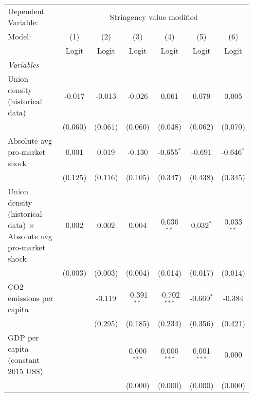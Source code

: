 
\begingroup
\centering
\begin{tabular}{lcccccc}
   \toprule
   Dependent Variable: & \multicolumn{6}{c}{Stringency value modified}\\
   Model:                                                                  & (1)     & (2)     & (3)           & (4)            & (5)           & (6)\\  
                                                                           &  Logit  & Logit   & Logit         & Logit          & Logit         & Logit\\  
   \midrule
   \emph{Variables}\\
   Union density (historical data)                                         & -0.017  & -0.013  & -0.026        & 0.061          & 0.079         & 0.005\\   
                                                                           & (0.060) & (0.061) & (0.060)       & (0.048)        & (0.062)       & (0.070)\\   
   Absolute avg pro-market shock                                           & 0.001   & 0.019   & -0.130        & -0.655$^{*}$   & -0.691        & -0.646$^{*}$\\   
                                                                           & (0.125) & (0.116) & (0.105)       & (0.347)        & (0.438)       & (0.345)\\   
   Union density (historical data) $\times$ Absolute avg pro-market shock  & 0.002   & 0.002   & 0.004         & 0.030$^{**}$   & 0.032$^{*}$   & 0.033$^{**}$\\   
                                                                           & (0.003) & (0.003) & (0.004)       & (0.014)        & (0.017)       & (0.014)\\   
   CO2 emissions per capita                                                &         & -0.119  & -0.391$^{**}$ & -0.702$^{***}$ & -0.669$^{*}$  & -0.384\\   
                                                                           &         & (0.295) & (0.185)       & (0.234)        & (0.356)       & (0.421)\\   
   GDP per capita (constant 2015 US\$)                                     &         &         & 0.000$^{***}$ & 0.000$^{***}$  & 0.001$^{***}$ & 0.000\\   
                                                                           &         &         & (0.000)       & (0.000)        & (0.000)       & (0.000)\\   

\end{tabular}
